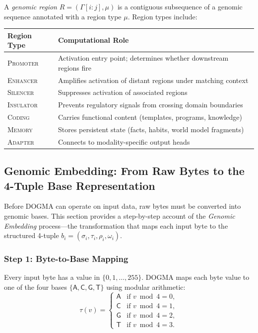 \begin{definition}
A \emph{genomic region} $R = (\Gamma[i:j], \mu)$ is a contiguous subsequence of a genomic sequence annotated with a region type $\mu$. Region types include:
\begin{center}
\renewcommand{\arraystretch}{1.12}
\begin{tabularx}{0.85\textwidth}{L{2.5cm} Y}
\toprule
\textbf{Region Type} & \textbf{Computational Role} \\
\midrule
\textsc{Promoter} & Activation entry point; determines whether downstream regions fire \\
\textsc{Enhancer} & Amplifies activation of distant regions under matching context \\
\textsc{Silencer} & Suppresses activation of associated regions \\
\textsc{Insulator} & Prevents regulatory signals from crossing domain boundaries \\
\textsc{Coding} & Carries functional content (templates, programs, knowledge) \\
\textsc{Memory} & Stores persistent state (facts, habits, world model fragments) \\
\textsc{Adapter} & Connects to modality-specific output heads \\
\bottomrule
\end{tabularx}
\end{center}
\end{definition}

\subsection{Genomic Embedding: From Raw Bytes to the 4-Tuple Base Representation}
\label{sec:genomic-embedding}

Before DOGMA can operate on input data, raw bytes must be converted into genomic bases. This section provides a step-by-step account of the \emph{Genomic Embedding} process---the transformation that maps each input byte to the structured 4-tuple $b_i = (\sigma_i, \tau_i, \rho_i, \omega_i)$.

\subsubsection{Step 1: Byte-to-Base Mapping}

Every input byte has a value in $\{0, 1, \ldots, 255\}$. DOGMA maps each byte value to one of the four bases $\{\mathsf{A}, \mathsf{C}, \mathsf{G}, \mathsf{T}\}$ using modular arithmetic:
\begin{equation}
\tau(v) = \begin{cases}
\mathsf{A} & \text{if } v \bmod 4 = 0, \\
\mathsf{C} & \text{if } v \bmod 4 = 1, \\
\mathsf{G} & \text{if } v \bmod 4 = 2, \\
\mathsf{T} & \text{if } v \bmod 4 = 3.
\end{cases}
\label{eq:byte-to-base}
\end{equation}

